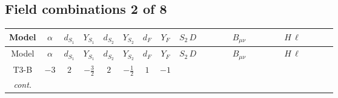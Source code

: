 \documentclass[8pt]{article}
\begin{document}
\begin{landscape}
\subsection*{Field combinations 2 of 8}
\begin{longtable}{@{}cccccccc >{\raggedright\arraybackslash}p{0.21\linewidth} >{\raggedright\arraybackslash}p{0.21\linewidth} >{\raggedright\arraybackslash}p{0.21\linewidth}@{}}
\toprule
Model & $\alpha$ & $d_{S_1}$ & $Y_{S_1}$ & $d_{S_2}$ & $Y_{S_2}$ & $d_F$ & $Y_F$ & $S_2\,D$ & $B_{\mu\nu}$ & $H\,\ell$ \\
\midrule
\endfirsthead
\toprule
Model & $\alpha$ & $d_{S_1}$ & $Y_{S_1}$ & $d_{S_2}$ & $Y_{S_2}$ & $d_F$ & $Y_F$ & $S_2\,D$ & $B_{\mu\nu}$ & $H\,\ell$ \\
\midrule
\endhead
T3-B & $-3$ & $2$ & $-\frac{3}{2}$ & $2$ & $-\frac{1}{2}$ & $1$ & $-1$ & \scriptsize\adjustbox{max width=\linewidth}{$\begin{gathered} +D_{\mu _1}\left(S_{2,j_1}\right){}^{\dagger } D_{\mu _1}\left(S_{2,j_1}\right)\end{gathered}$} & \scriptsize\adjustbox{max width=\linewidth}{$\begin{gathered} -\frac{\hbar  B_{\mu _1\mu _2}^2}{\epsilon }\end{gathered}$} & \scriptsize\adjustbox{max width=\linewidth}{$\begin{gathered} +\frac{2 \hbar  \overline{y_{1,i_1,r_1}} \overline{y_{2,i_2,r_1}} L_{a_4,i_2}{}^T\, C\, P_L\, L_{a_2,i_1} H_{a_1} H_{a_3} \lambda_5 \epsilon_{a_1,a_2} \epsilon_{a_3,a_4}}{\sqrt{3} \epsilon  M_F} \\ +\frac{2 \hbar  \overline{y_{1,i_1,r_1}} \overline{y_{2,i_2,r_1}} L_{a_4,i_2}{}^T\, C\, P_L\, L_{a_2,i_1} H_{a_1} H_{a_3} \lambda_5 \epsilon_{a_1,a_2} \epsilon_{a_3,a_4}}{\sqrt{3} M_F} \\ +\frac{2 \hbar  \overline{\lambda_5} \overline{L_{a_3,i_1}}\, C\, P_R\, \overline{L_{a_4,i_2}}{}^T y_{1,i_1,r_1} y_{2,i_2,r_1} \epsilon_{a_1,a_3} \epsilon_{a_2,a_4} H_{a_1}{}^{\dagger } H_{a_2}{}^{\dagger }}{\sqrt{3} \epsilon  M_F}\end{gathered}$} \\
\textit{cont.} &  &  &  &  &  &  &  &  &  & \scriptsize\adjustbox{max width=\linewidth}{$\begin{gathered} +\frac{2 \hbar  \overline{\lambda_5} \overline{L_{a_3,i_1}}\, C\, P_R\, \overline{L_{a_4,i_2}}{}^T y_{1,i_1,r_1} y_{2,i_2,r_1} \epsilon_{a_1,a_3} \epsilon_{a_2,a_4} H_{a_1}{}^{\dagger } H_{a_2}{}^{\dagger }}{\sqrt{3} M_F}\end{gathered}$} \\
\midrule
\bottomrule
\end{longtable}
\clearpage

\end{landscape}
\end{document}
